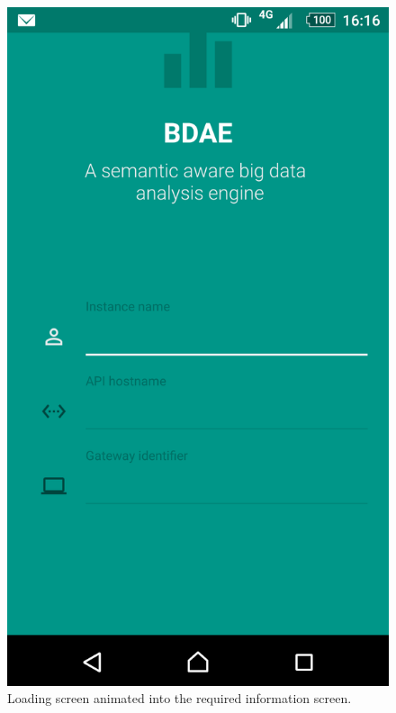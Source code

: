 \begin{figure}[h!]
\begin{minipage}[b]{0.4\textwidth}
    		\includegraphics[width=\textwidth]{img/information.png}
  	\end{minipage}
  	\caption[]{Loading screen animated into the required information screen.}
\end{figure}

